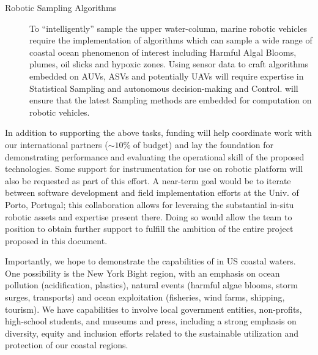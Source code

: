 \begin{description}
\item[Robotic Sampling Algorithms] To ``intelligently'' sample the upper
  water-column, marine robotic vehicles require the implementation of
  algorithms which can sample a wide range of coastal ocean phenomenon
  of interest including Harmful Algal Blooms, plumes, oil slicks and
  hypoxic zones. Using sensor data to craft algorithms embedded on AUVs,
  ASVs and potentially UAVs will require expertise in Statistical
  Sampling and autonomous decision-making and Control. \pro will ensure
  that the latest Sampling methods are embedded for computation on
  robotic vehicles.

\end{description}

\noindent
In addition to supporting the above tasks, \kck funding will help
coordinate work with our international partners ($\sim 10\%$ of
budget) and lay the foundation for demonstrating performance and
evaluating the operational skill of the proposed technologies. Some
support for instrumentation for use on robotic platform will also be
requested as part of this effort. A near-term goal would be to iterate
between software development and field implementation efforts at the
Univ. of Porto, Portugal; this collaboration allows for leveraing the
substantial in-situ robotic assets and expertise present there.  Doing
so would allow the team to position \pro to obtain further support to
fulfill the ambition of the entire project proposed in this document.

Importantly, we hope to demonstrate the capabilities of \pro in US
coastal waters. One possibility is the New York Bight region, with an
emphasis on ocean pollution (acidification, plastics), natural events
(harmful algae blooms, storm surges, transports) and ocean
exploitation (fisheries, wind farms, shipping, tourism). We have
capabilities to involve local government entities, non-profits,
high-school students, and museums and press, including a strong
emphasis on diversity, equity and inclusion efforts related to the
sustainable utilization and protection of our coastal regions.

